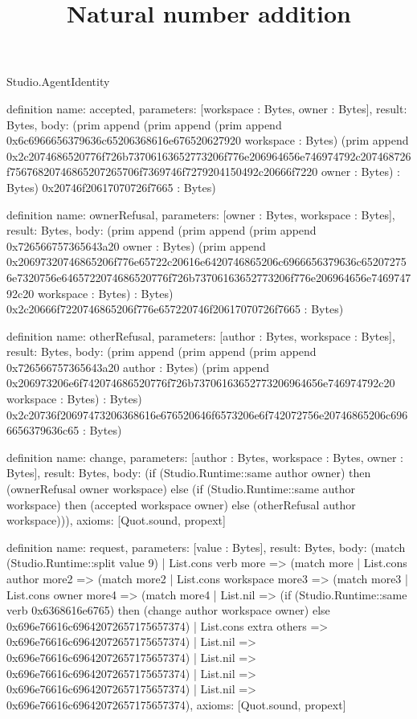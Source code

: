 \begin{lexlean}{Studio.AgentIdentity}
\title{Natural number addition}
\begin{semanticmodule}
definition{
  name: accepted,
  parameters: [workspace : Bytes, owner : Bytes],
  result: Bytes,
  body: (prim append (prim append (prim append 0x6c6966656379636c65206368616e676520627920 workspace : Bytes) (prim append 0x2c2074686520776f726b73706163652773206f776e206964656e746974792c207468726f75676820746865207265706f7369746f7279204150492c20666f7220 owner : Bytes) : Bytes) 0x20746f20617070726f7665 : Bytes)
}

definition{
  name: ownerRefusal,
  parameters: [owner : Bytes, workspace : Bytes],
  result: Bytes,
  body: (prim append (prim append (prim append 0x726566757365643a20 owner : Bytes) (prim append 0x20697320746865206f776e65722c20616e6420746865206c6966656379636c652072756e7320756e6465722074686520776f726b73706163652773206f776e206964656e746974792c20 workspace : Bytes) : Bytes) 0x2c20666f7220746865206f776e657220746f20617070726f7665 : Bytes)
}

definition{
  name: otherRefusal,
  parameters: [author : Bytes, workspace : Bytes],
  result: Bytes,
  body: (prim append (prim append (prim append 0x726566757365643a20 author : Bytes) (prim append 0x206973206e6f742074686520776f726b73706163652773206964656e746974792c20 workspace : Bytes) : Bytes) 0x2c20736f20697473206368616e676520646f6573206e6f742072756e20746865206c6966656379636c65 : Bytes)
}

definition{
  name: change,
  parameters: [author : Bytes, workspace : Bytes, owner : Bytes],
  result: Bytes,
  body: (if (Studio.Runtime::same author owner) then (ownerRefusal owner workspace) else (if (Studio.Runtime::same author workspace) then (accepted workspace owner) else (otherRefusal author workspace))),
  axioms: [Quot.sound, propext]
}

definition{
  name: request,
  parameters: [value : Bytes],
  result: Bytes,
  body: (match (Studio.Runtime::split value 9)
    | List.cons verb more => (match more
      | List.cons author more2 => (match more2
        | List.cons workspace more3 => (match more3
          | List.cons owner more4 => (match more4
            | List.nil => (if (Studio.Runtime::same verb 0x6368616e6765) then (change author workspace owner) else 0x696e76616c69642072657175657374)
            | List.cons extra others => 0x696e76616c69642072657175657374)
          | List.nil => 0x696e76616c69642072657175657374)
        | List.nil => 0x696e76616c69642072657175657374)
      | List.nil => 0x696e76616c69642072657175657374)
    | List.nil => 0x696e76616c69642072657175657374),
  axioms: [Quot.sound, propext]
}


\end{semanticmodule}
\end{lexlean}
